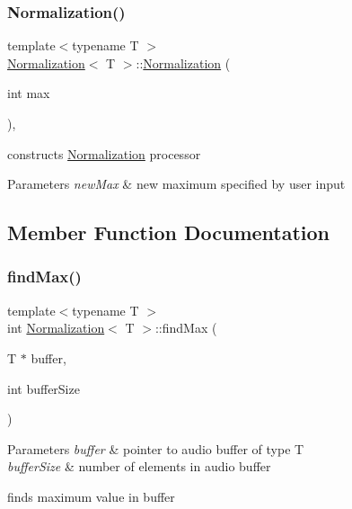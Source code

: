 \subsubsection{\texorpdfstring{Normalization()}{Normalization()}}
{\footnotesize\ttfamily template$<$typename T $>$ \\
\hyperlink{classNormalization}{Normalization}$<$ T $>$\+::\hyperlink{classNormalization}{Normalization} (\begin{DoxyParamCaption}\item[{int}]{max }\end{DoxyParamCaption})\hspace{0.3cm}{\ttfamily [inline]}, {\ttfamily [explicit]}}

constructs \hyperlink{classNormalization}{Normalization} processor 
\begin{DoxyParams}{Parameters}
{\em new\+Max} & new maximum specified by user input \\
\hline
\end{DoxyParams}


\subsection{Member Function Documentation}
\mbox{\label{classNormalization_a0ca4f15e6f0d23ec77c2946583e248b6}} 
\subsubsection{\texorpdfstring{find\+Max()}{findMax()}}
{\footnotesize\ttfamily template$<$typename T $>$ \\
int \hyperlink{classNormalization}{Normalization}$<$ T $>$\+::find\+Max (\begin{DoxyParamCaption}\item[{T $\ast$}]{buffer,  }\item[{int}]{buffer\+Size }\end{DoxyParamCaption})\hspace{0.3cm}{\ttfamily [inline]}}


\begin{DoxyParams}{Parameters}
{\em buffer} & pointer to audio buffer of type T \\
\hline
{\em buffer\+Size} & number of elements in audio buffer\\
\hline
\end{DoxyParams}
finds maximum value in buffer \mbox{\label{classNormalization_a0f441de817c3dbb8348cb9dfd66879d7}} 
